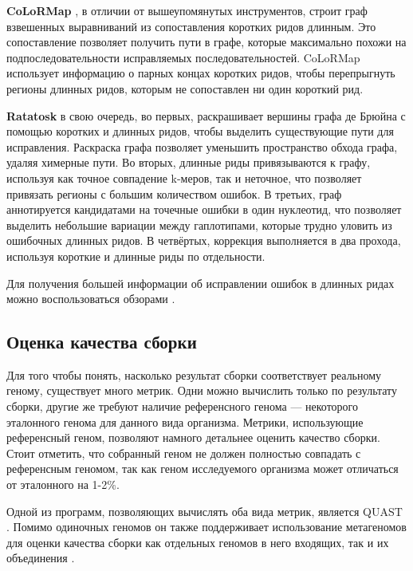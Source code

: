 \documentclass[14pt]{matmex-diploma-custom}
\begin{document}
\textbf{CoLoRMap} \cite{art:haghshenas2016colormap}, в отличии от вышеупомянутых инструментов, строит граф взвешенных выравниваний из сопоставления коротких ридов длинным. Это сопоставление позволяет получить пути в графе, которые максимально похожи на подпоследовательности исправляемых последовательностей. CoLoRMap использует информацию о парных концах коротких ридов, чтобы перепрыгнуть регионы длинных ридов, которым не сопоставлен ни один короткий рид.

\textbf{Ratatosk} \cite{art:holley2021ratatosk} в свою очередь, во первых, раскрашивает вершины графа де Брюйна с помощью коротких и длинных ридов, чтобы выделить существующие пути для исправления. Раскраска графа позволяет уменьшить пространство обхода графа, удаляя химерные пути.
Во вторых, длинные риды привязываются к графу, используя как точное совпадение k-меров, так и неточное, что позволяет привязать регионы с большим количеством ошибок. В третьих, граф аннотируется кандидатами на точечные ошибки в один нуклеотид, что позволяет выделить небольшие вариации между гаплотипами, которые трудно уловить из ошибочных длинных ридов. В четвёртых, коррекция выполняется в два прохода, используя короткие и длинные риды по отдельности.

Для получения большей информации об исправлении ошибок в длинных ридах можно воспользоваться обзорами \cite{art:morisse2020long, art:zook2016extensive, art:zhang2020comprehensive}.

\subsection{Оценка качества сборки}
Для того чтобы понять, насколько результат сборки соответствует реальному геному, существует много метрик. Одни можно вычислить только по результату сборки, другие же требуют наличие референсного генома --- некоторого эталонного генома для данного вида организма. Метрики, использующие референсный геном, позволяют намного детальнее оценить качество сборки. Стоит отметить, что собранный геном не должен полностью совпадать с референсным геномом, так как геном исследуемого организма может отличаться от эталонного на 1-2\%.

Одной из программ, позволяющих вычислять оба вида метрик, является QUAST \cite{art:QUAST}. Помимо одиночных геномов он также поддерживает использование  метагеномов для оценки качества сборки как отдельных геномов в него входящих, так и их объединения \cite{art:metaquast}.

\end{document}
